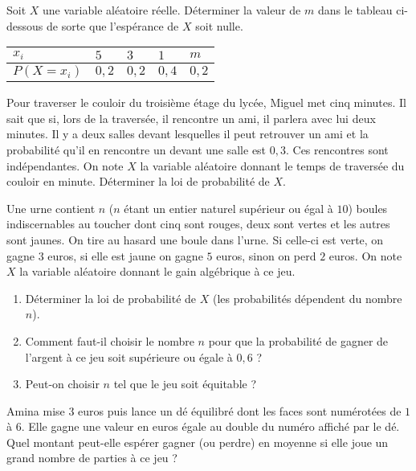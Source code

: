 \documentclass[11pt]{article}
\begin{document}
\begin{exo}
Soit $X$ une variable aléatoire réelle. Déterminer la
valeur de $m$ dans le tableau ci-dessous de sorte que l'espérance de $X$ soit
nulle.
\begin{center}
  \renewcommand{\arraystretch}{1.3}
  \begin{tabularx}{.7\textwidth}{|Y|Y|Y|Y|Y|}
    \hline
    $x_i$ & $5$ & $3$ & $1$ & $m$ \\
    \hline
    $P\left( X=x_i \right)$ & $0,2$ & $0,2$ & $0,4$ & $0,2$\\
    \hline
  \end{tabularx}
\end{center}
\end{exo}

\begin{exo}
  Pour traverser le couloir du troisième étage du lycée, Miguel met cinq
  minutes. Il sait que si, lors de la traversée, il rencontre un ami, il
  parlera avec lui deux minutes. Il y a deux salles devant lesquelles il peut
  retrouver un ami et la probabilité qu'il en rencontre un devant une salle est
  $0,3$. Ces rencontres sont indépendantes. On note $X$ la variable aléatoire
  donnant le temps de traversée du couloir en minute. Déterminer la loi de
  probabilité de $X$.
\end{exo}

\begin{exo}
  Une urne contient $n$ ($n$ étant un entier naturel supérieur ou égal à $10$)
  boules indiscernables au toucher dont cinq sont rouges, deux sont vertes et
  les autres sont jaunes. On tire au hasard une boule dans l'urne. Si celle-ci
  est verte, on gagne $3$ euros, si elle est jaune on gagne $5$ euros, sinon on
  perd $2$ euros. On note $X$ la variable aléatoire donnant le gain algébrique
  à ce jeu.
  \begin{enumerate}
    \item Déterminer la loi de probabilité de $X$ (les probabilités dépendent du
      nombre $n$).
    \item Comment faut-il choisir le nombre $n$ pour que la probabilité de
      gagner de l'argent à ce jeu soit supérieure ou égale à $0,6$ ?
    \item Peut-on choisir $n$ tel que le jeu soit équitable ?
  \end{enumerate}
\end{exo}

\begin{exo}
  Amina mise $3$ euros puis lance un dé équilibré dont les faces sont numérotées
  de $1$ à $6$. Elle gagne une valeur en euros égale au double du numéro affiché
  par le dé. Quel montant peut-elle espérer gagner (ou perdre) en moyenne si
  elle joue un grand nombre de parties à ce jeu ?
\end{exo}
\end{document}

